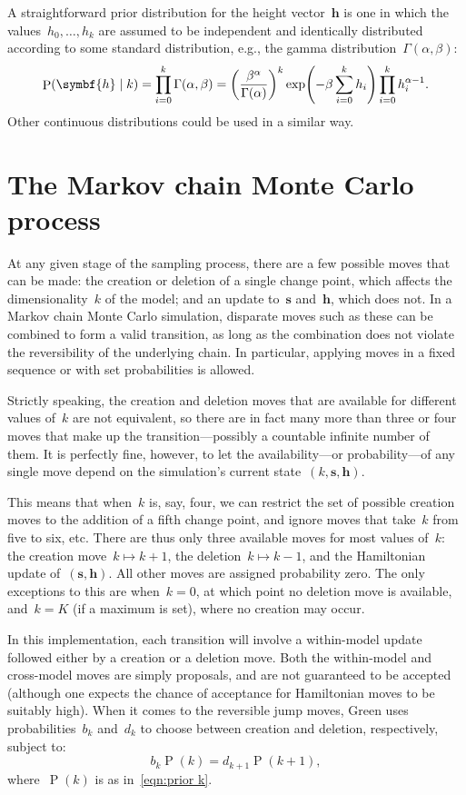 \documentclass[11pt,a4paper]{article}
\newcommand\ub[1]{\symbf{#1}}                    %
\DeclareMathOperator\Pb{P}                       %
\DeclarePairedDelimiter\lr{\lparen}{\rparen}     %
\theoremstyle{definition}
\begin{document}
A straightforward prior distribution for the height vector~$\ub{h}$ is one in
which the values~$h_0,\dots,h_k$ are assumed to be independent and identically
distributed according to some standard distribution, e.g., the gamma
distribution~$\Gamma(\alpha,\beta)$:
\begin{equation}\label{eqn:prior h}
  \Pb(\ub{h} \mid k) = \prod_{i=0}^k \Gamma(\alpha,\beta)
    = \lr*{\frac{\beta^\alpha}{\Gamma(\alpha)}}^k
      \exp\lr*{-\beta\sum_{i=0}^k h_i} \prod_{i=0}^k h_i^{\alpha-1}.
\end{equation}
Other continuous distributions could be used in a similar way.

\section{The Markov chain Monte Carlo process} %

At any given stage of the sampling process, there are a few possible moves that
can be made: the creation or deletion of a single change point, which affects
the dimensionality~$k$ of the model; and an update to~$\ub{s}$ and~$\ub{h}$,
which does not. In a Markov chain Monte Carlo simulation, disparate moves such
as these can be combined to form a valid transition, as long as the combination
does not violate the reversibility of the underlying chain. In particular,
applying moves in a fixed sequence or with set probabilities is allowed.

Strictly speaking, the creation and deletion moves that are available for
different values of~$k$ are not equivalent, so there are in fact many more than
three or four moves that make up the transition---possibly a countable infinite
number of them. It is perfectly fine, however, to let the availability---or
probability---of any single move depend on the simulation's current
state~$(k,\ub{s},\ub{h})$.

This means that when~$k$ is, say, four, we can restrict the set of possible
creation moves to the addition of a fifth change point, and ignore moves that
take~$k$ from five to six, etc. There are thus only three available moves for
most values of~$k$: the creation move~$k \mapsto k+1$, the deletion~$k \mapsto
k-1$, and the Hamiltonian update of~$(\ub{s},\ub{h})$. All other moves are
assigned probability zero. The only exceptions to this are when~$k = 0$, at
which point no deletion move is available, and~$k = K$ (if a maximum is set),
where no creation may occur.

In this implementation, each transition will involve a within-model update
followed either by a creation or a deletion move. Both the within-model and
cross-model moves are simply proposals, and are not guaranteed to be accepted
(although one expects the chance of acceptance for Hamiltonian moves to be
suitably high). When it comes to the reversible jump moves, Green uses
probabilities~$b_k$ and~$d_k$ to choose between creation and deletion,
respectively, subject to:
\[ b_k \Pb(k) = d_{k+1} \Pb(k+1), \]
where~$\Pb(k)$ is as in~\eqref{eqn:prior k}.
\end{document}

